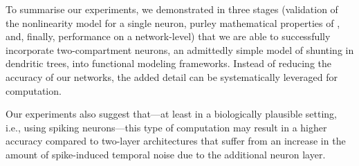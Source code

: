To summarise our experiments, we demonstrated in three stages (validation of the nonlinearity model \Hcond for a single neuron, purley mathematical properties of \Hcond, and, finally, performance on a network-level) that we are able to successfully incorporate two-compartment \LIF neurons, an admittedly simple model of shunting in dendritic trees, into functional modeling frameworks.
Instead of reducing the accuracy of our networks, the added detail can be systematically leveraged for computation.

Our experiments also suggest that---at least in a biologically plausible setting, i.e., using spiking neurons---this type of computation may result in a higher accuracy compared to two-layer architectures that suffer from an increase in the amount of spike-induced temporal noise due to the additional neuron layer.

